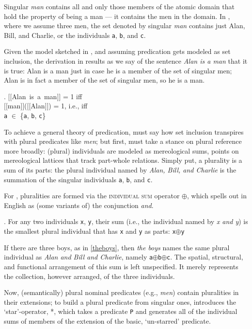 \documentclass[linguex]{sp}
\newcommand{\sem}[1]{\mbox{$[\![$#1$]\!]$}}
\renewcommand{\tt}{\texttt}
\begin{document}
Singular \emph{man} contains all and only those members of the atomic domain that hold the property of being a man --- it contains the men in the domain. In \Last, where we assume three men, the set denoted by singular \emph{man} contains just Alan, Bill, and Charlie, or the individuals \tt{a}, \tt{b}, and \tt{c}.

Given the model sketched in \Last, and assuming predication gets modeled as set inclusion, the derivation in \Next results as we say of the sentence \emph{Alan is a man} that it is true: Alan is a man just in case he is a member of the set of singular men; Alan is in fact a member of the set of singular men, so he is a man.

\ex. \sem{Alan is a man} = 1 iff\\
\sem{man}(\sem{Alan}) = 1, i.e., iff\\
\texttt{a} $\in$ \{\texttt{a}, \texttt{b}, \texttt{c}\}

To achieve a general theory of predication, \citeauthor{link1983} must say how set inclusion transpires with plural predicates like \emph{men}; but first, \citeauthor{link1983} must take a stance on plural reference more broadly: (plural) individuals are modeled as mereological sums, points on mereological lattices that track part-whole relations. Simply put, a plurality is a sum of its parts: the plural individual named by \emph{Alan, Bill, and Charlie} is the summation of the singular individuals \tt{a}, \tt{b}, and \tt{c}. 

For \citeauthor{link1983}, pluralities are formed via the \textsc{individual sum} operator $\oplus$, which spells out in English as (some variants of) the conjunction \emph{and}.

\ex. For any two individuals \texttt{x}, \texttt{y}, their sum (i.e., the individual named by \emph{x and y}) is the smallest plural individual that has \texttt{x} and \texttt{y} as parts: \texttt{x}$\oplus$\texttt{y}

If there are three boys, as in \ref{theboys}, then \emph{the boys} names the same plural individual as \emph{Alan and Bill and Charlie}, namely \texttt{a}$\oplus$\texttt{b}$\oplus$\texttt{c}. The spatial, structural, and functional arrangement of this sum is left unspecified. It merely represents the collection, however arranged, of the three individuals.

Now, (semantically) plural nominal predicates (e.g., \emph{men}) contain pluralities in their extensions; to build a plural predicate from singular ones, \citeauthor{link1983} introduces the `star'-operator, *, which takes a predicate \texttt{P} and generates all of the individual sums of members of the extension of the basic, `un-starred' predicate.
\end{document}
